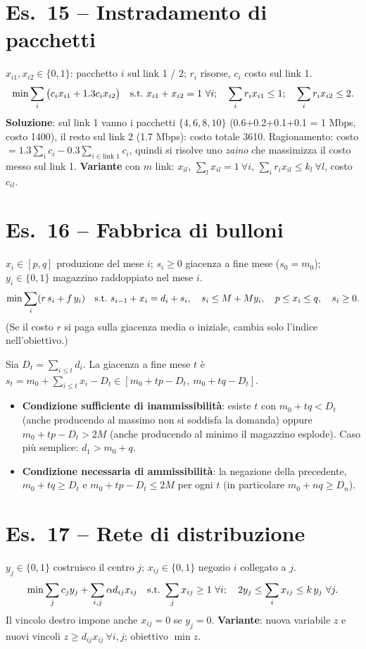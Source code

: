 \section*{Es.\ 15 -- Instradamento di pacchetti}
$x_{i1},x_{i2}\in\{0,1\}$: pacchetto $i$ sul link 1 / 2; $r_i$ risorse, $c_i$ costo sul link 1.
\[ \min\sum_i\big(c_ix_{i1}+1.3c_ix_{i2}\big)\quad\st\ x_{i1}+x_{i2}=1\ \forall i;\quad \sum_ir_ix_{i1}\le1;\quad\sum_ir_ix_{i2}\le2. \]
\textbf{Soluzione}: sul link 1 vanno i pacchetti $\{4,6,8,10\}$ (0.6+0.2+0.1+0.1 = 1 Mbps, costo 1400), il resto sul link 2 (1.7 Mbps): costo totale 3610. Ragionamento: costo $=1.3\sum_ic_i-0.3\sum_{i\in\text{link 1}}c_i$, quindi si risolve uno \emph{zaino} che massimizza il costo messo sul link 1.
\textbf{Variante} con $m$ link: $x_{il}$, $\sum_lx_{il}=1\ \forall i$, $\sum_ir_ix_{il}\le k_l\ \forall l$, costo $c_{il}$.

\section*{Es.\ 16 -- Fabbrica di bulloni}
$x_i\in[p,q]$ produzione del mese $i$; $s_i\ge0$ giacenza a fine mese ($s_0=m_0$); $y_i\in\{0,1\}$ magazzino raddoppiato nel mese $i$.
\[ \min\sum_i(r\,s_i+f\,y_i)\quad\st\ s_{i-1}+x_i=d_i+s_i,\quad s_i\le M+My_i,\quad p\le x_i\le q,\quad s_i\ge0. \]
(Se il costo $r$ si paga sulla giacenza media o iniziale, cambia solo l'indice nell'obiettivo.)

Sia $D_t=\sum_{i\le t}d_i$. La giacenza a fine mese $t$ è $s_t=m_0+\sum_{i\le t}x_i-D_t\in[m_0+tp-D_t,\ m_0+tq-D_t]$.
\begin{itemize}[nosep]
\item \textbf{Condizione sufficiente di inammissibilità}: esiste $t$ con $m_0+tq<D_t$ (anche producendo al massimo non si soddisfa la domanda) oppure $m_0+tp-D_t>2M$ (anche producendo al minimo il magazzino esplode). Caso più semplice: $d_1>m_0+q$.
\item \textbf{Condizione necessaria di ammissibilità}: la negazione della precedente, $m_0+tq\ge D_t$ e $m_0+tp-D_t\le2M$ per ogni $t$ (in particolare $m_0+nq\ge D_n$).
\end{itemize}

\section*{Es.\ 17 -- Rete di distribuzione}
$y_j\in\{0,1\}$ costruisco il centro $j$; $x_{ij}\in\{0,1\}$ negozio $i$ collegato a $j$.
\[ \min\sum_jc_jy_j+\sum_{i,j}\alpha d_{ij}x_{ij}\quad\text{s.t.}\ \sum_jx_{ij}\ge1\ \forall i;\quad 2y_j\le\sum_ix_{ij}\le k\,y_j\ \forall j. \]
Il vincolo destro impone anche $x_{ij}=0$ se $y_j=0$.
\textbf{Variante}: nuova variabile $z$ e nuovi vincoli $z\ge d_{ij}x_{ij}\ \forall i,j$; obiettivo $\min z$.


